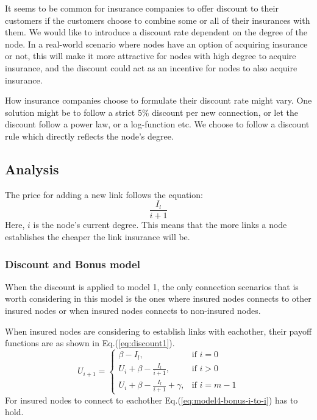  It seems to be common for insurance companies to offer discount to their customers if the customers choose to combine some or all of their insurances with them. We would like to introduce a discount rate dependent on the degree of the node. In a real-world scenario where nodes have an option of acquiring insurance or not, this will make it more attractive for nodes with high degree to acquire insurance, and the discount could act as an incentive for nodes to also acquire insurance. 

How insurance companies choose to formulate their discount rate might vary. One solution might be to follow a strict 5$\%$ discount per new connection, or let the discount follow a power law, or a log-function etc. We choose to follow a discount rule which directly reflects the node's degree.

\subsection{Analysis}
The price for adding a new link follows the equation:
\begin{equation}
\frac{I_{l}}{i+1}
\label{eq:discount0}
\end{equation}
Here, $i$ is the node's current degree. This means that the more links a node establishes the cheaper the link insurance will be. 

\subsubsection{Discount and Bonus model}

When the discount is applied to model 1, the only connection scenarios that is worth considering in this model is the ones where insured nodes connects to other insured nodes or when insured nodes connects to non-insured nodes.

When insured nodes are considering to establish links with eachother, their payoff functions are as shown in Eq.(\ref{eq:discount1}).  
\begin{equation}
    U_{i+1}= 
\begin{cases}
    \beta - I_{l},& \text{if } i = 0\\
    U_{i}+\beta -\frac{I_{l}}{i+1},& \text{if }  i>0\\
    U_{i}+\beta -\frac{I_{l}}{i+1}+\gamma,& \text{if } i=m-1
\end{cases}
\label{eq:discount1}
\end{equation}
For insured nodes to connect to eachother Eq.(\ref{eq:model4-bonus-i-to-i}) has to hold.

